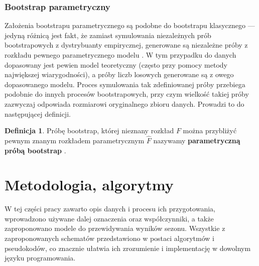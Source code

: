 \documentclass[inzynierska]{pwr_wmat_praca_dyplomowa}
\theoremstyle{plain}
\numberwithin{theorem}{chapter}
\theoremstyle{definition}
\numberwithin{theorem}{chapter}
\newtheorem{definition}[theorem]{Definicja}
\begin{document}
\subsection{Bootstrap parametryczny}
Założenia bootstrapu parametrycznego są podobne do bootstrapu klasycznego --- jedyną różnicą jest fakt, że zamiast symulowania niezależnych prób bootstrapowych z dystrybuanty empirycznej, generowane są niezależne próby z rozkładu pewnego parametrycznego modelu \cite{bootstrap2}.
W tym przypadku do danych dopasowany jest pewien model teoretyczny (często przy pomocy metody największej wiarygodności), a próby liczb losowych generowane są z owego dopasowanego modelu. Proces symulowania tak zdefiniowanej próby przebiega podobnie do innych procesów bootstrapowych, przy czym wielkość takiej próby zazwyczaj odpowiada rozmiarowi oryginalnego zbioru danych. Prowadzi to do następującej definicji.
\begin{definition}
	Próbę bootstrap, której nieznany rozkład $F$ można przybliżyć pewnym znanym rozkładem parametrycznym $\hat{F}$ nazywamy \textbf{parametryczną próbą bootstrap} \cite{efron2}. 
\end{definition}
 
 
\chapter{Metodologia, algorytmy}\label{rodzial_algorytmy}
W tej części pracy zawarto opis danych i procesu ich przygotowania, wprowadzono używane dalej oznaczenia oraz współczynniki, a także zaproponowano modele do przewidywania wyników sezonu. Wszystkie z zaproponowanych schematów przedstawiono w postaci algorytmów i pseudokodów, co znacznie ułatwia ich zrozumienie i implementację w dowolnym języku programowania.  
\end{document}
